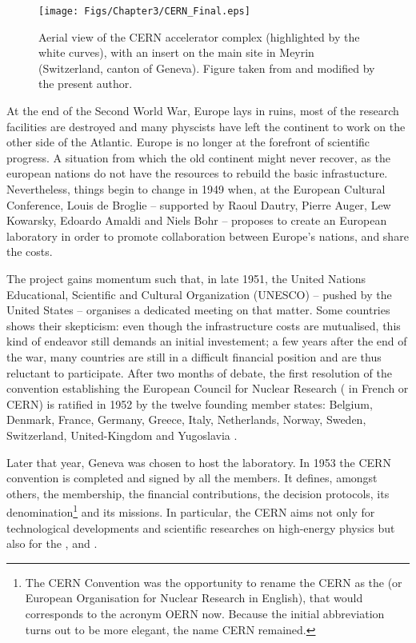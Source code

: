 \begin{figure}[t]
	\centering
	\texttt{[image: Figs/Chapter3/CERN\_Final.eps]}
	\caption{Aerial view of the CERN accelerator complex (highlighted by the white curves), with an insert on the main site in Meyrin (Switzerland, canton of Geneva). Figure taken from \cite{PuzzleGrandCollisionneur} and modified by the present author.}
	\label{fig:CERNView}
\end{figure}

At the end of the Second World War, Europe lays in ruins, most of the research facilities are destroyed and many physcists have left the continent to work on the other side of the Atlantic. Europe is no longer at the forefront of scientific progress. A situation from which the old continent might never recover, as the european nations do not have the resources to rebuild the basic infrastucture. Nevertheless, things begin to change in 1949 when, at the European Cultural Conference, Louis de Broglie -- supported by Raoul Dautry, Pierre Auger, Lew Kowarsky, Edoardo Amaldi and Niels Bohr -- proposes to create an European laboratory in order to promote collaboration between Europe's nations, and share the costs.

The project gains momentum such that, in late 1951, the United Nations Educational, Scientific and Cultural Organization (UNESCO) -- pushed by the United States -- organises a dedicated meeting on that matter. Some countries shows their skepticism: even though the infrastructure costs are mutualised, this kind of endeavor still demands an initial investement; a few years after the end of the war, many countries are still in a difficult financial position and are thus reluctant to participate. After two months of debate, the first resolution of the convention establishing the European Council for Nuclear Research ( in French or CERN) is ratified in 1952 by the twelve founding member states: Belgium, Denmark, France, Germany, Greece, Italy, Netherlands, Norway, Sweden, Switzerland, United-Kingdom and Yugoslavia \cite{deroseParis1951Birth2008}.

Later that year, Geneva was chosen to host the laboratory. In 1953 the CERN convention is completed and signed by all the members. It defines, amongst others, the membership, the financial contributions, the decision protocols, its denomination\footnote{The CERN Convention was the opportunity to rename the CERN as the  (or European Organisation for Nuclear Research in English), that would corresponds to the acronym OERN now. Because the initial abbreviation turns out to be more elegant, the name CERN remained.} and its missions. In particular, the CERN aims not only for technological developments and scientific researches on high-energy physics but also for the , and  \cite{cerncouncilConventionEstablishmentEuropean1953}.\\

